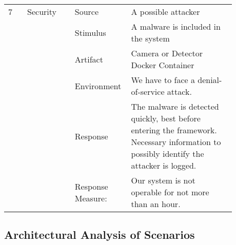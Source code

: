 {\begin{longtable}{|P{0.08\linewidth}|P{0.2\linewidth}|P{0.16\linewidth} P{0.44\linewidth}|}
 7 & Security & Source  & A possible attacker\\
   & & Stimulus  & A malware is included in the system\\ 
   & & Artifact  & Camera or Detector Docker Container\\ 
   & & Environment  & We have to face a denial-of-service attack.  \\ 
   & & Response  & The malware is detected quickly, best before entering the framework. Necessary information to possibly identify the attacker is logged.\\ 
   & & Response Measure:  & Our system is not operable for not more than an hour.\\ \hline
\end{longtable}

\subsection{Architectural Analysis of Scenarios}

}
